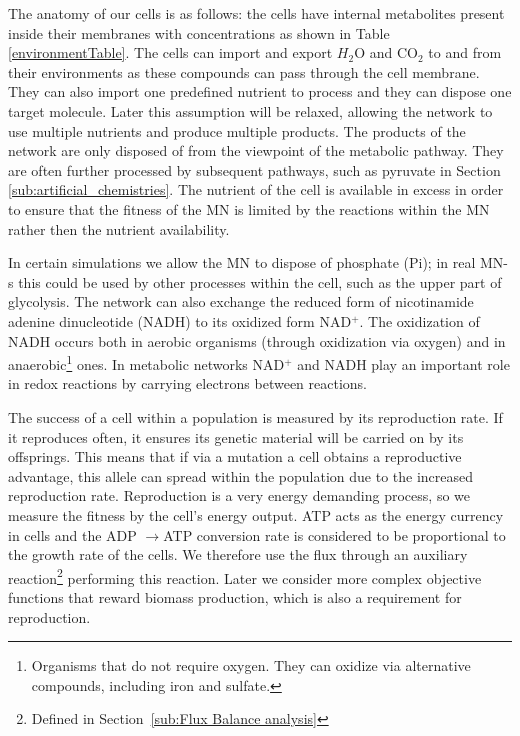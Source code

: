\documentclass[a4paper,12pt]{article}
\begin{document}
	The anatomy of our cells is as follows: the cells have internal metabolites present inside their membranes with concentrations as shown in Table \ref{environmentTable}. The cells can import and export $H_2$O and CO$_2$ to and from their environments as these compounds can pass through the cell membrane. They can also import one predefined nutrient to process and they can dispose one target molecule. Later this assumption will be relaxed, allowing the network to use multiple nutrients and produce multiple products. The products of the network are only disposed of from the viewpoint of the metabolic pathway. They are often further processed by subsequent pathways, such as pyruvate in Section \ref{sub:artificial_chemistries}. The nutrient of the cell is available in excess in order to ensure that the fitness of the MN is limited by the reactions within the MN rather then the nutrient availability. 
	
	In certain simulations we allow the MN to dispose of phosphate (Pi); in real MN-s this could be used by other processes within the cell, such as the upper part of glycolysis. The network can also exchange the reduced form of nicotinamide adenine dinucleotide (NADH) to its oxidized form NAD$^+$. The oxidization of NADH occurs both in aerobic organisms (through oxidization via oxygen) and in anaerobic\footnote{ Organisms that do not require oxygen. They can oxidize via alternative compounds, including iron and sulfate.} ones. In metabolic networks NAD$^+$ and NADH play an important role in redox reactions by carrying electrons between reactions\cite{principlesofbio}.

	The success of a cell within a population is measured by its reproduction rate. If it reproduces often, it ensures its genetic material will be carried on by its offsprings. This means that if via a mutation a cell obtains a reproductive advantage, this allele can spread within the population due to the increased reproduction rate. Reproduction is a very energy demanding process, so we measure the fitness by the cell's energy output. ATP acts as the energy currency in cells and the ADP $\rightarrow$ATP conversion rate is considered to be proportional to the growth rate of the cells. We therefore use the flux through an auxiliary reaction\footnote{Defined in Section~\ref{sub:Flux Balance analysis}} performing this reaction. Later we consider more complex objective functions that reward biomass production, which is also a requirement for reproduction. 
\end{document}
